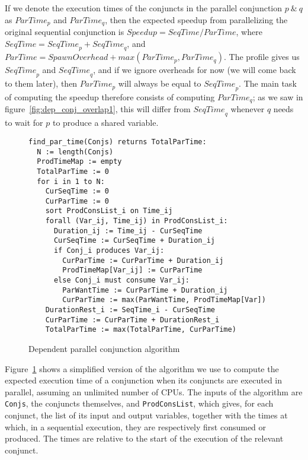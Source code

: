 If we denote the execution times of the conjuncts
in the parallel conjunction $p~\&~q$
as ${ParTime}_p$ and ${ParTime}_q$,
then the expected speedup
from parallelizing the original sequential conjunction
is ${Speedup} = {SeqTime} / {ParTime}$,
where ${SeqTime} = {SeqTime}_p + {SeqTime}_q$,
and ${ParTime} = {SpawnOverhead} + {max}({ParTime}_p, {ParTime}_q)$.
The profile gives us ${SeqTime}_p$ and ${SeqTime}_q$,
and if we ignore overheads for now (we will come back to them later),
then ${ParTime}_p$ will always be equal to ${SeqTime}_p$.
The main task of computing the speedup
therefore consists of computing ${ParTime}_q$;
as we saw in figure~\ref{fig:dep_conj_overlap1},
this will differ from ${SeqTime}_q$
whenever $q$ needs to wait for $p$ to produce a shared variable.

\begin{figure}[tb]
\begin{center}
\begin{verbatim}
find_par_time(Conjs) returns TotalParTime:
  N := length(Conjs)
  ProdTimeMap := empty
  TotalParTime := 0
  for i in 1 to N:
    CurSeqTime := 0
    CurParTime := 0
    sort ProdConsList_i on Time_ij
    forall (Var_ij, Time_ij) in ProdConsList_i:
      Duration_ij := Time_ij - CurSeqTime
      CurSeqTime := CurSeqTime + Duration_ij
      if Conj_i produces Var_ij:
        CurParTime := CurParTime + Duration_ij
        ProdTimeMap[Var_ij] := CurParTime
      else Conj_i must consume Var_ij:
        ParWantTime := CurParTime + Duration_ij
        CurParTime := max(ParWantTime, ProdTimeMap[Var])
    DurationRest_i := SeqTime_i - CurSeqTime
    CurParTime := CurParTime + DurationRest_i
    TotalParTime := max(TotalParTime, CurParTime)
\end{verbatim}
\end{center}
\caption{Dependent parallel conjunction algorithm}
\label{fig:dep_par_conj_overlap_middle}
\end{figure}

Figure~\ref{fig:dep_par_conj_overlap_middle} shows
a simplified version of the algorithm we use to compute
the expected execution time of a conjunction
when its conjuncts are executed in parallel,
assuming an unlimited number of CPUs.
The inputs of the algorithm are \verb|Conjs|, the conjuncts themselves,
and \verb|ProdConsList|,
which gives, for each conjunct,
the list of its input and output variables,
together with the times at which,
in a sequential execution,
they are respectively first consumed or produced.
The times are relative to the start of the execution of the relevant conjunct.

